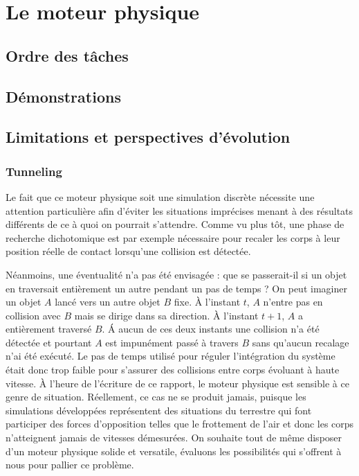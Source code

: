 \section{Le moteur physique}

\subsection{Ordre des tâches}

\subsection{Démonstrations}

\subsection{Limitations et perspectives d'évolution}

\subsubsection{Tunneling}

Le fait que ce moteur physique soit une simulation discrète nécessite
une attention particulière afin d'éviter les situations imprécises
menant à des résultats différents de ce à quoi on pourrait
s'attendre. Comme vu plus tôt, une phase de recherche dichotomique est
par exemple nécessaire pour recaler les corps à leur position réelle
de contact lorsqu'une collision est détectée.

Néanmoins, une éventualité n'a pas été envisagée : que se passerait-il
si un objet en traversait entièrement un autre pendant un pas de temps
? On peut imaginer un objet $A$ lancé vers un autre objet $B$
fixe. \`A l'instant $t$, $A$ n'entre pas en collision avec $B$ mais se
dirige dans sa direction. \`A l'instant $t+1$, $A$ a entièrement
traversé $B$. \'A aucun de ces deux instants une collision n'a été
détectée et pourtant $A$ est impunément passé à travers $B$ sans
qu'aucun recalage n'ai été exécuté. Le pas de temps utilisé pour
réguler l'intégration du système était donc trop faible pour s'assurer
des collisions entre corps évoluant à haute vitesse. \`A l'heure de
l'écriture de ce rapport, le moteur physique est sensible à ce genre
de situation. Réellement, ce cas ne se produit jamais, puisque les
simulations développées représentent des situations du terrestre qui
font participer des forces d'opposition telles que le frottement de
l'air et donc les corps n'atteignent jamais de vitesses démesurées. On
souhaite tout de même disposer d'un moteur physique solide et
versatile, évaluons les possibilités qui s'offrent à nous pour pallier
ce problème.

